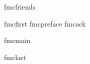 








\langi fmcfriends

\langi fmcfirst
\printshorttoc
\printlongtoc
\langi fmcpreface
\langi fmcack

\langi fmcmain

\printpartpage{\appendicesname}
\printproofsappendix
\printhintsappendix
\printsolutionsappendix
\printcodeappendix

\printsymbolglossary
\printindexofnames
\printindexofterms
\langi fmclast

\makereport

\bye
